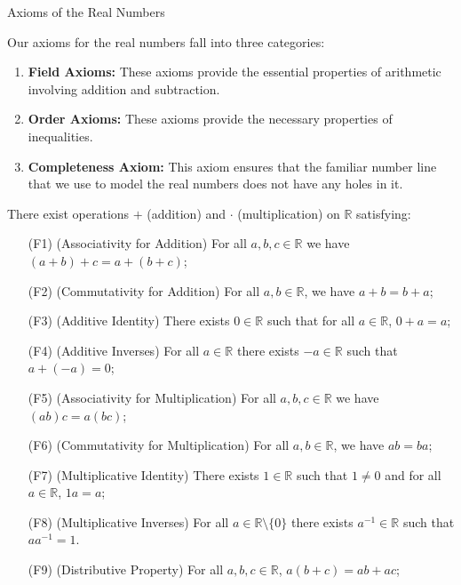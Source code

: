 \begin{section}{Axioms of the Real Numbers}\label{sec:AxiomsRealNumbers}

Our axioms for the real numbers fall into three categories:
\begin{enumerate}
\item \textbf{Field Axioms:} These axioms provide the essential properties of arithmetic involving addition and subtraction.
\item \textbf{Order Axioms:} These axioms provide the necessary properties of inequalities.
\item \textbf{Completeness Axiom:} This axiom ensures that the familiar number line that we use to model the real numbers does not have any holes in it.
\end{enumerate}

\begin{fieldaxioms}\label{axiom:field axioms}
There exist operations $+$ (addition) and $\cdot$ (multiplication) on $\mathbb{R}$ satisfying:
\begin{enumerate}
\item[(F1)] (Associativity for Addition) For all $a, b, c\in \mathbb{R}$ we have $(a+b)+c = a+(b+c)$;
\item[(F2)] (Commutativity for Addition) For all $a,b\in \mathbb{R}$, we have $a+b=b+a$;
\item[(F3)] (Additive Identity) There exists $0\in\mathbb{R}$ such that for all $a\in\mathbb{R}$, $0+a=a$;
\item[(F4)] (Additive Inverses) For all $a\in\mathbb{R}$ there exists $-a\in\mathbb{R}$ such that $a+(-a)=0$;

\item[(F5)] (Associativity for Multiplication) For all $a, b, c\in \mathbb{R}$ we have $(ab)c = a(bc)$;
\item[(F6)] (Commutativity for Multiplication) For all $a,b\in \mathbb{R}$, we have $ab=ba$;
\item[(F7)] (Multiplicative Identity) There exists $1\in\mathbb{R}$ such that $1\neq 0$ and for all $a\in\mathbb{R}$, $1a=a$;
\item[(F8)] (Multiplicative Inverses) For all $a\in\mathbb{R}\setminus\{0\}$ there exists $a^{-1}\in\mathbb{R}$ such that $aa^{-1}=1$.
\item[(F9)] (Distributive Property) For all $a,b,c\in \mathbb{R}$, $a(b+c)=ab+ac$;
\end{enumerate}
\end{fieldaxioms}


\end{section}

